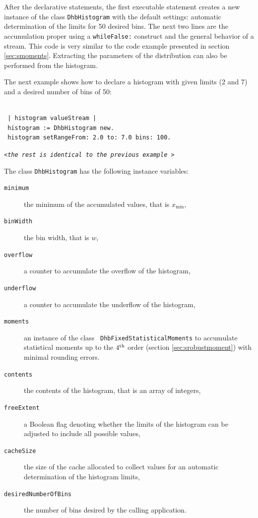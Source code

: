 \documentclass[twoside]{book}
\begin{document}
After the declarative statements, the first executable statement
creates a new instance of the class {\tt DhbHistogram} with the
default settings: automatic determination of the limits for 50
desired bins. The next two lines are the accumulation proper using
a {\tt whileFalse:} construct and the general behavior of a
stream. This code is very similar to the code example presented in
section \ref{sec:smoments}. Extracting the parameters of the
distribution can also be performed from the histogram.

\noindent The next example shows how to declare a histogram with
given limits (2 and 7) and a desired number of bins of 50:
\begin{codeExample}
\begin{verbatim}

 | histogram valueStream |
 histogram := DhbHistogram new.
 histogram setRangeFrom: 2.0 to: 7.0 bins: 100.
\end{verbatim}
\hfil {\tt<\sl the rest is identical to the previous example\tt
>}\hfil
\end{codeExample}

\noindent The class {\tt DhbHistogram} has the following instance
variables:
\begin{description}
  \item[\tt minimum] the minimum of the accumulated values, that
  is $x_{\min}$,
  \item[\tt binWidth] the bin width, that is $w$,
  \item[\tt overflow] a counter to accumulate the overflow of the histogram,
  \item[\tt underflow] a counter to accumulate the underflow of the histogram,
  \item[\tt moments] an instance of the class {\tt
  DhbFixedStatisticalMoments} to accumulate statistical moments up
  to the $4^{\mathop{\rm th}}$ order (\cf section \ref{sec:srobustmoment}) with
  minimal rounding errors.
  \item[\tt contents] the contents of the histogram, that is an
  array of integers,
  \item[\tt freeExtent] a Boolean flag denoting whether the limits
  of the histogram can be adjusted to include all possible values,
  \item[\tt cacheSize] the size of the cache allocated to collect
  values for an automatic determination of the histogram limits,
  \item[\tt desiredNumberOfBins] the number of bins desired by the
  calling application.
\end{description}
\end{document}

